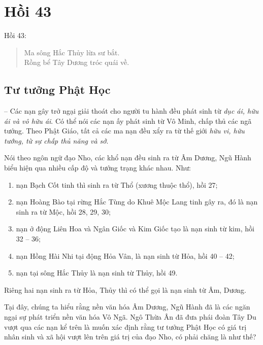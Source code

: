 \chapter{Hồi 43} %
\label{cha:hoi_43}

Hồi 43:

\begin{verse}
\begin{itshape}
Ma sông Hắc Thủy lừa sư bắt.\\
Rồng bể Tây Dương tróc quái về.
\end{itshape}
\end{verse}

\section{Tư tưởng Phật Học} %
\label{sec:43_phat_hoc}

-- Các nạn gây trở ngại giải thoát cho người tu hành đều phát sinh từ \emph{dục ái, hữu ái và vô hữu ái}. Có thể nói các nạn ấy phát sinh từ Vô Minh, chấp thủ các ngã tướng. Theo Phật Giáo, tất cả các ma nạn đều xẩy ra từ thế giới \emph{hữu vi, hữu tướng, từ sự chấp thủ năng và sở}.

Nói theo ngôn ngữ đạo Nho, các khổ nạn đều sinh ra từ Âm Dương, Ngũ Hành biểu hiện qua nhiều cấp độ và tướng trạng khác nhau. Như:

\begin{enumerate}[label=\itshape\arabic*\upshape/]
    \item nạn Bạch Cốt tinh thì sinh ra từ Thổ (xương thuộc thổ), hồi 27;

    \item nạn Hoàng Bào tại rừng Hắc Tùng do Khuê Mộc Lang tinh gây ra, đó là nạn sinh ra từ Mộc, hồi 28, 29, 30;

    \item nạn ở động Liên Hoa và Ngân Giốc và Kim Giốc tạo là nạn sinh từ kim, hồi 32 -- 36;

    \item nạn Hồng Hài Nhi tại động Hỏa Vân, là nạn sinh từ Hỏa, hồi 40 -- 42;

    \item nạn tại sông Hắc Thủy là nạn sinh từ Thủy, hồi 49.
\end{enumerate}

Riêng hai nạn sinh ra từ Hỏa, Thủy thì có thể gọi là nạn sinh từ Âm, Dương.

Tại đây, chúng ta hiểu rằng nền văn hóa Âm Dương, Ngũ Hành đã là các ngăn ngại sự phát triển nền văn hóa Vô Ngã. Ngô Thừa Ân đã đưa phái đoàn Tây Du vượt qua các nạn kể trên là muốn xác định rằng tư tưởng Phật Học có giá trị nhân sinh và xã hội vượt lên trên giá trị của đạo Nho, có phải chăng là như thế?

